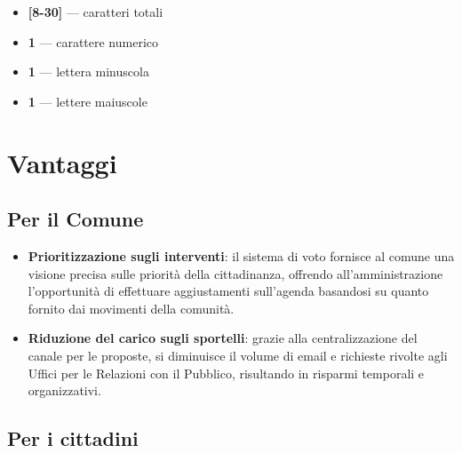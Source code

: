 \begin{description}
\begin{itemize}
	\item \textbf{[8-30]} — caratteri totali
	\item \textbf{1} — carattere numerico
	\item \textbf{1} — lettera minuscola
	\item \textbf{1} — lettere maiuscole
\end{itemize}

\end{description}

\section{Vantaggi}

\subsection{Per il Comune}

\begin{itemize}
	
	\item \textbf{Prioritizzazione sugli interventi}: il sistema di voto fornisce al comune una visione precisa sulle priorità della cittadinanza, offrendo all'amministrazione l'opportunità di effettuare aggiustamenti sull'agenda basandosi su quanto fornito dai movimenti della comunità.

  \item \textbf{Riduzione del carico sugli sportelli}: grazie alla centralizzazione del canale per le proposte, si diminuisce il volume di email e richieste rivolte agli Uffici per le Relazioni con il Pubblico, risultando in risparmi temporali e organizzativi.
  
\end{itemize}

\subsection{Per i cittadini}

